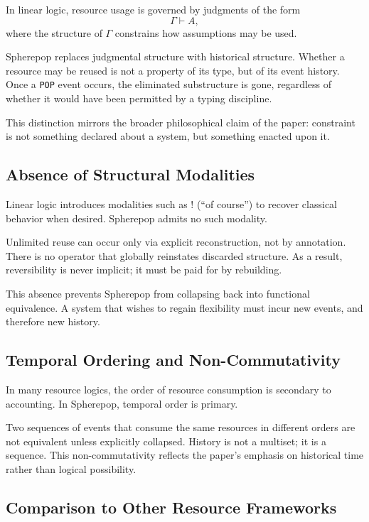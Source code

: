 \documentclass[11pt]{article}
\begin{document}
In linear logic, resource usage is governed by judgments of the form
\[
\Gamma \vdash A,
\]
where the structure of $\Gamma$ constrains how assumptions may be used.

Spherepop replaces judgmental structure with historical structure. Whether a resource may be reused is not a property of its type, but of its event history. Once a \texttt{POP} event occurs, the eliminated substructure is gone, regardless of whether it would have been permitted by a typing discipline.

This distinction mirrors the broader philosophical claim of the paper: constraint is not something declared about a system, but something enacted upon it.

\subsection{Absence of Structural Modalities}

Linear logic introduces modalities such as \(!\) (“of course”) to recover classical behavior when desired. Spherepop admits no such modality.

Unlimited reuse can occur only via explicit reconstruction, not by annotation. There is no operator that globally reinstates discarded structure. As a result, reversibility is never implicit; it must be paid for by rebuilding.

This absence prevents Spherepop from collapsing back into functional equivalence. A system that wishes to regain flexibility must incur new events, and therefore new history.

\subsection{Temporal Ordering and Non-Commutativity}

In many resource logics, the order of resource consumption is secondary to accounting. In Spherepop, temporal order is primary.

Two sequences of events that consume the same resources in different orders are not equivalent unless explicitly collapsed. History is not a multiset; it is a sequence. This non-commutativity reflects the paper’s emphasis on historical time rather than logical possibility.

\subsection{Comparison to Other Resource Frameworks}
\end{document}
